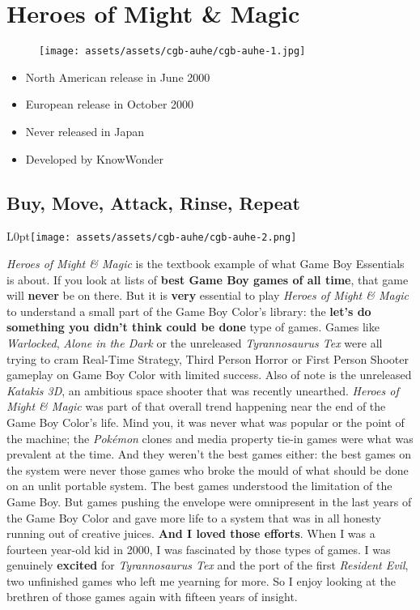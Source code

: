 \documentclass{book}
\begin{document}
\chapter*{Heroes of Might \& Magic}
\vspace{\baselineskip}\begin{figure}[H]{\texttt{[image: assets/assets/cgb-auhe/cgb-auhe-1.jpg]}}\end{figure}\vspace{\baselineskip}
\begin{itemize}[left=0pt, nosep]
\item North American release in June 2000
\item European release in October 2000
\item Never released in Japan
\item Developed by KnowWonder

\end{itemize}
\newpage\FloatBarrier\section*{Buy, Move, Attack, Rinse, Repeat}
\begin{wrapfigure}{L}{0pt}{\texttt{[image: assets/assets/cgb-auhe/cgb-auhe-2.png]}}\end{wrapfigure}\noindent
\emph{Heroes of Might \& Magic} is the textbook example of what Game Boy Essentials is about. If you look at lists of \textbf{best Game Boy games of all time}, that game will \textbf{never} be on there. But it is \textbf{very} essential to play \emph{Heroes of Might \& Magic} to understand a small part of the Game Boy Color’s library: the \textbf{let’s do something you didn’t think could be done} type of games. Games like \emph{Warlocked}, \emph{Alone in the Dark} or the unreleased \emph{Tyrannosaurus Tex} were all trying to cram Real-Time Strategy, Third Person Horror or First Person Shooter gameplay on Game Boy Color with limited success. Also of note is the unreleased \emph{Katakis 3D}, an ambitious space shooter that was recently unearthed. \emph{Heroes of Might \& Magic} was part of that overall trend happening near the end of the Game Boy Color’s life. Mind you, it was never what was popular or the point of the machine; the \emph{Pokémon} clones and media property tie-in games were what was prevalent at the time. And they weren’t the best games either: the best games on the system were never those games who broke the mould of what should be done on an unlit portable system. The best games understood the limitation of the Game Boy. But games pushing the envelope were omnipresent in the last years of the Game Boy Color and gave more life to a system that was in all honesty running out of creative juices. \textbf{And I loved those efforts}. When I was a fourteen year-old kid in 2000, I was fascinated by those types of games. I was genuinely \textbf{excited} for \emph{Tyrannosaurus Tex} and the port of the first \emph{Resident Evil}, two unfinished games who left me yearning for more. So I enjoy looking at the brethren of those games again with fifteen years of insight.\par
\end{document}
